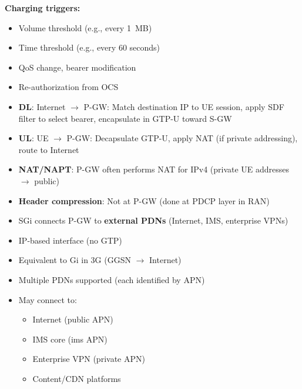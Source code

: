 \textbf{Charging triggers:}

\begin{itemize}
\tightlist
\item
  Volume threshold (e.g., every 1~MB)
\item
  Time threshold (e.g., every 60 seconds)
\item
  QoS change, bearer modification
\item
  Re-authorization from OCS
\end{itemize}


\begin{itemize}
\tightlist
\item
  \textbf{DL}: Internet \ensuremath{\to} P-GW: Match destination IP to UE session, apply SDF filter to select bearer, encapsulate in GTP-U toward S-GW
\item
  \textbf{UL}: UE \ensuremath{\to} P-GW: Decapsulate GTP-U, apply NAT (if private addressing), route to Internet
\item
  \textbf{NAT/\allowbreak{}NAPT}: P-GW often performs NAT for IPv4 (private UE addresses \ensuremath{\to} public)
\item
  \textbf{Header compression}: Not at P-GW (done at PDCP layer in RAN)
\end{itemize}


\begin{itemize}
\tightlist
\item
  SGi connects P-GW to \textbf{external PDNs} (Internet, IMS, enterprise VPNs)
\item
  IP-based interface (no GTP)
\item
  Equivalent to Gi in 3G (GGSN \ensuremath{\to} Internet)
\item
  Multiple PDNs supported (each identified by APN)
\item
  May connect to:

  \begin{itemize}
  \tightlist
  \item
    Internet (public APN)
  \item
    IMS core (ims APN)
  \item
    Enterprise VPN (private APN)
  \item
    Content/\allowbreak{}CDN platforms
  \end{itemize}
\end{itemize}

